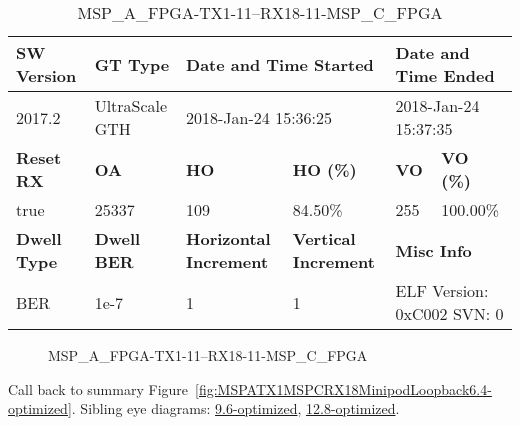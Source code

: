 \begin{table}[h]
\centering
\caption{MSP\_A\_FPGA-TX1-11--RX18-11-MSP\_C\_FPGA}
\label{tab:MSPAFPGATX111RX1811MSPCFPGA6.4-optimized}
\begin{tabular}{@{}|l|l|l|l|l|l|@{}}
\toprule
\textbf{SW Version}                & \textbf{GT Type}   & \multicolumn{2}{l|}{\textbf{Date and Time Started}}            & \multicolumn{2}{l|}{\textbf{Date and Time Ended}}        \\ \midrule
2017.2                       & UltraScale GTH          & \multicolumn{2}{l|}{2018-Jan-24 15:36:25}                   & \multicolumn{2}{l|}{2018-Jan-24 15:37:35}               \\ \midrule
\textbf{Reset RX}                  & \textbf{OA} & \textbf{HO}   & \textbf{HO (\%)} & \textbf{VO} & \textbf{VO (\%)} \\ \midrule
true & 25337        & 109          & 84.50\%        & 255        & 100.00\%       \\ \midrule
\textbf{Dwell Type}                & \textbf{Dwell BER} & \textbf{Horizontal Increment} & \textbf{Vertical Increment}    & \multicolumn{2}{l|}{\textbf{Misc Info}}                  \\ \midrule
BER                            & 1e-7        & 1        & 1           & \multicolumn{2}{l|}{ELF Version: 0xC002 SVN: 0}                         \\ \bottomrule
\end{tabular}
\end{table}

\begin{figure}[h]
\caption{MSP\_A\_FPGA-TX1-11--RX18-11-MSP\_C\_FPGA} \label{fig:MSPAFPGATX111RX1811MSPCFPGA6.4-optimized}
\end{figure}

Call back to summary Figure~\ref{fig:MSPATX1MSPCRX18MinipodLoopback6.4-optimized}.
Sibling eye diagrams: \hyperref[sec:MSPAFPGATX111RX1811MSPCFPGA9.6-optimized]{9.6-optimized}, \hyperref[sec:MSPAFPGATX111RX1811MSPCFPGA12.8-optimized]{12.8-optimized}.

\clearpage
\newpage

